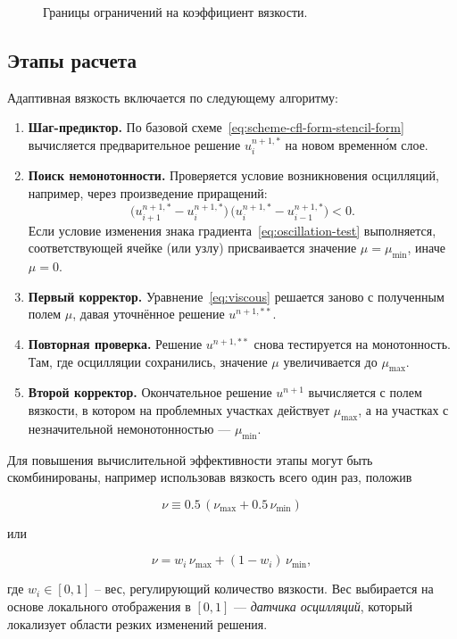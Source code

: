 \documentclass[14pt]{report}
\begin{document}
\begin{figure}[h]
\centering

\caption{Границы ограничений на коэффициент вязкости.}
\label{fig:adaptive-artificial-viscosity-coeff-bounds}
\end{figure}


\subsection{Этапы расчета}
Адаптивная вязкость включается по следующему алгоритму:
\begin{enumerate}
\item \textbf{Шаг-предиктор.} По базовой схеме~\eqref{eq:scheme-cfl-form-stencil-form} вычисляется предварительное решение $u^{n+1,*}_i$ на новом временн\'{о}м слое.
\item \textbf{Поиск немонотонности.} Проверяется условие возникновения осцилляций, например, через произведение приращений:
\begin{equation}
\bigl(u_{i+1}^{n+1,*} - u_i^{n+1,*}\bigr) \,
\bigl(u_i^{n+1,*} - u_{i-1}^{n+1,*}\bigr) < 0.
\label{eq:oscillation-test}
\end{equation}
Если условие изменения знака градиента~\eqref{eq:oscillation-test} выполняется, соответствующей ячейке (или узлу) присваивается значение $\mu = \mu_{\min}$, иначе $\mu = 0$.
\item \textbf{Первый корректор.} Уравнение~\eqref{eq:viscous} решается заново с полученным полем $\mu$, давая уточнённое решение $u^{n+1,**}$.
\item \textbf{Повторная проверка.} Решение $u^{n+1,**}$ снова тестируется на монотонность. Там, где осцилляции сохранились, значение $\mu$ увеличивается до $\mu_{\max}$.
\item \textbf{Второй корректор.} Окончательное решение $u^{n+1}$ вычисляется с полем вязкости, в котором на проблемных участках действует $\mu_{\max}$, а на участках с незначительной немонотонностью --- $\mu_{\min}$.
\end{enumerate}
Для повышения вычислительной эффективности этапы могут быть скомбинированы, например использовав вязкость всего один раз, положив

\[
    \nu \equiv 0.5\, (\nu_{\max} + 0.5\, \nu_{\min})
\]

или

\[
    \nu = w_i\,\nu_{\max}  + (1 - w_i)\, \nu_{\min},
\]

где $w_i \in [0,1]$ -- вес, регулирующий количество вязкости. Вес выбирается на основе локального отображения в $[0, 1]$ --- \emph{датчика осцилляций}, который локализует области резких изменений решения.
\end{document}
